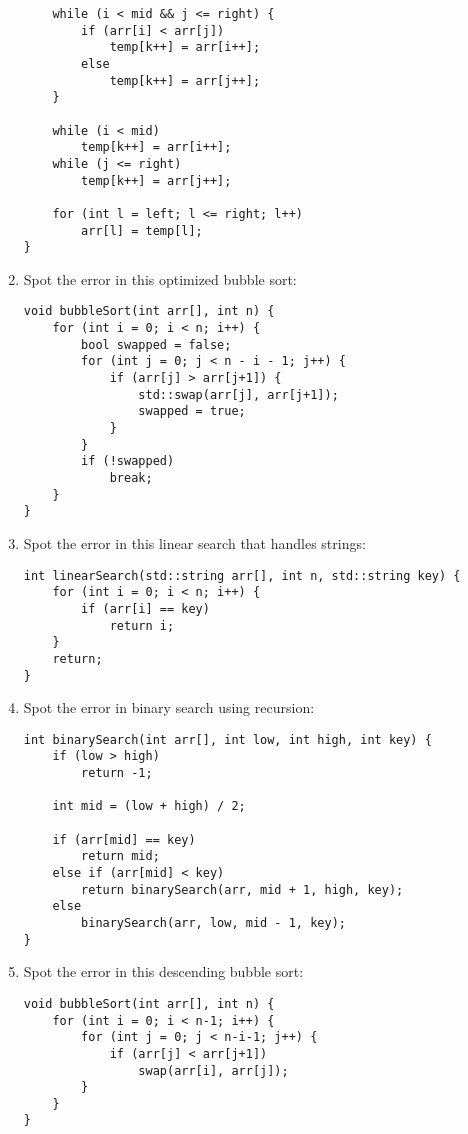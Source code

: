 \documentclass[a4paper,12pt]{article}
\begin{document}
\begin{enumerate}
\begin{lstlisting}
    while (i < mid && j <= right) {
        if (arr[i] < arr[j])
            temp[k++] = arr[i++];
        else
            temp[k++] = arr[j++];
    }

    while (i < mid)
        temp[k++] = arr[i++];
    while (j <= right)
        temp[k++] = arr[j++];

    for (int l = left; l <= right; l++)
        arr[l] = temp[l];
}
\end{lstlisting}

    \item Spot the error in this optimized bubble sort:
\begin{lstlisting}
void bubbleSort(int arr[], int n) {
    for (int i = 0; i < n; i++) {
        bool swapped = false;
        for (int j = 0; j < n - i - 1; j++) {
            if (arr[j] > arr[j+1]) {
                std::swap(arr[j], arr[j+1]);
                swapped = true;
            }
        }
        if (!swapped)
            break;
    }
}
\end{lstlisting}

    \item Spot the error in this linear search that handles strings:
\begin{lstlisting}
int linearSearch(std::string arr[], int n, std::string key) {
    for (int i = 0; i < n; i++) {
        if (arr[i] == key)
            return i;
    }
    return;
}
\end{lstlisting}

    \item Spot the error in binary search using recursion:
\begin{lstlisting}
int binarySearch(int arr[], int low, int high, int key) {
    if (low > high)
        return -1;

    int mid = (low + high) / 2;

    if (arr[mid] == key)
        return mid;
    else if (arr[mid] < key)
        return binarySearch(arr, mid + 1, high, key);
    else
        binarySearch(arr, low, mid - 1, key);
}
\end{lstlisting}

    \item Spot the error in this descending bubble sort:
\begin{lstlisting}
void bubbleSort(int arr[], int n) {
    for (int i = 0; i < n-1; i++) {
        for (int j = 0; j < n-i-1; j++) {
            if (arr[j] < arr[j+1])
                swap(arr[i], arr[j]);
        }
    }
}
\end{lstlisting}
\end{enumerate}
\end{document}
